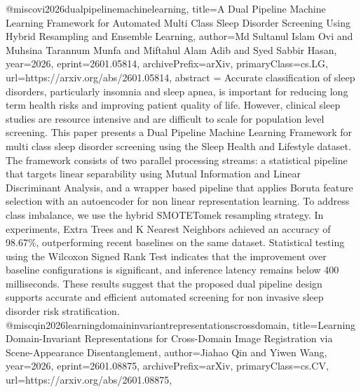 {}@misc{ovi2026dualpipelinemachinelearning,
      title={A Dual Pipeline Machine Learning Framework for Automated Multi Class Sleep Disorder Screening Using Hybrid Resampling and Ensemble Learning}, 
      author={Md Sultanul Islam Ovi and Muhsina Tarannum Munfa and Miftahul Alam Adib and Syed Sabbir Hasan},
      year={2026},
      eprint={2601.05814},
      archivePrefix={arXiv},
      primaryClass={cs.LG},
      url={https://arxiv.org/abs/2601.05814},
      abstract = {Accurate classification of sleep disorders, particularly insomnia and sleep apnea, is important for reducing long term health risks and improving patient quality of life. However, clinical sleep studies are resource intensive and are difficult to scale for population level screening. This paper presents a Dual Pipeline Machine Learning Framework for multi class sleep disorder screening using the Sleep Health and Lifestyle dataset. The framework consists of two parallel processing streams: a statistical pipeline that targets linear separability using Mutual Information and Linear Discriminant Analysis, and a wrapper based pipeline that applies Boruta feature selection with an autoencoder for non linear representation learning. To address class imbalance, we use the hybrid SMOTETomek resampling strategy. In experiments, Extra Trees and K Nearest Neighbors achieved an accuracy of 98.67\%, outperforming recent baselines on the same dataset. Statistical testing using the Wilcoxon Signed Rank Test indicates that the improvement over baseline configurations is significant, and inference latency remains below 400 milliseconds. These results suggest that the proposed dual pipeline design supports accurate and efficient automated screening for non invasive sleep disorder risk stratification.}
}@misc{qin2026learningdomaininvariantrepresentationscrossdomain,
      title={Learning Domain-Invariant Representations for Cross-Domain Image Registration via Scene-Appearance Disentanglement}, 
      author={Jiahao Qin and Yiwen Wang},
      year={2026},
      eprint={2601.08875},
      archivePrefix={arXiv},
      primaryClass={cs.CV},
      url={https://arxiv.org/abs/2601.08875},
}
